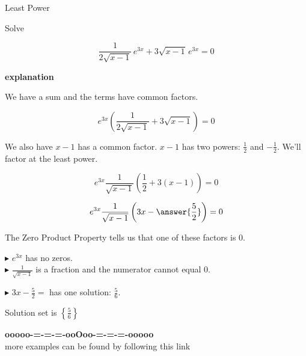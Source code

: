 \documentclass{ximera}
\begin{document}
\begin{example} Least Power



Solve 


\[  \frac{1}{2 \sqrt{x-1}} \, e^{3x}  + 3 \sqrt{x-1} \, e^{3x} = 0  \]


\textbf{\textcolor{red!75!green}{explanation}} 

We have a sum and the terms have common factors.



\[  e^{3x}  \left( \frac{1}{2 \sqrt{x-1}}  + 3 \sqrt{x-1}  \right) = 0  \]



We also have $x-1$ has a common factor.  $x-1$ has two powers: $\tfrac{1}{2}$ and $-\tfrac{1}{2}$.  We'll factor at the least power.


\[  e^{3x}  \frac{1}{\sqrt{x-1}}   \left( \frac{1}{2}  + 3 (x-1)  \right) = 0 \]

\[  e^{3x}  \frac{1}{\sqrt{x-1}}   \left( 3x - \answer{\frac{5}{2}}  \right) = 0  \]





The Zero Product Property tells us that one of these factors is $0$.



$\blacktriangleright$   $e^{3x}$ has no zeros. \\


$\blacktriangleright$   $\frac{1}{\sqrt{x-1}}$ is a fraction and the numerator cannot equal $0$.


$\blacktriangleright$  $3x - \frac{5}{2} = $ has one solution:  $\frac{5}{6}$.



Solution set is $\left\{  \frac{5}{6} \right\}$



\end{example}
















\begin{onlineOnly}
\begin{center}
\textbf{\textcolor{green!50!black}{ooooo-=-=-=-ooOoo-=-=-=-ooooo}} \\

more examples can be found by following this link\\ 

\end{center}
\end{onlineOnly}
\end{document}
